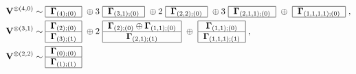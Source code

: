 \documentclass[12pt,reqno]{amsart}
\numberwithin{equation}{section}
\theoremstyle{plain}
\theoremstyle{definition}
\def\o{\otimes}
\def\glV_#1{\boldsymbol\Gamma_{#1}}
\def\VV{\mathbf V}
\begin{document}
\begin{align*}
    \VV^{\o(4,0)} &\sim
    \begin{tabular}{|c|}
        \hline
        $\glV_{(4);(0)}$\\
        \hline
    \end{tabular}
    \ \oplus 3\
    \begin{tabular}{|c|}
        \hline
        $\glV_{(3,1);(0)}$\\
        \hline
    \end{tabular}
    \ \oplus 2\
    \begin{tabular}{|c|}
        \hline
        $\glV_{(2,2);(0)}$\\
        \hline
    \end{tabular}
    \ \oplus 3\
    \begin{tabular}{|c|}
        \hline
        $\glV_{(2,1,1);(0)}$\\
        \hline
    \end{tabular}
    \ \oplus \
    \begin{tabular}{|c|}
        \hline
        $\glV_{(1,1,1,1);(0)}$\\
        \hline
    \end{tabular}\ ,
\\
    \VV^{\o(3,1)} & \sim
    \begin{tabular}{|c|}
        \hline
        $\glV_{(2);(0)}$\\
        \hline
        $\glV_{(3);(1)}$\\
        \hline
    \end{tabular}
    \ \oplus 2 \
    \begin{tabular}{|c|}
        \hline
        $\glV_{(2);(0)} \oplus \glV_{(1,1);(0)}$\\
        \hline
        $\glV_{(2,1);(1)}$\\
        \hline
    \end{tabular}
    \ \oplus \
    \begin{tabular}{|c|}
        \hline
        $\glV_{(1,1);(0)}$\\
        \hline
        $\glV_{(1,1,1);(1)}$\\
        \hline
    \end{tabular}\ ,
\\
    \VV^{\o(2,2)} &\sim
    \begin{tabular}{|c|}
        \hline
        $\glV_{(0);(0)}$\\
        \hline
        $\glV_{(1);(1)}$\\
        \hline

\end{tabular}
\end{align*}
\end{document}
